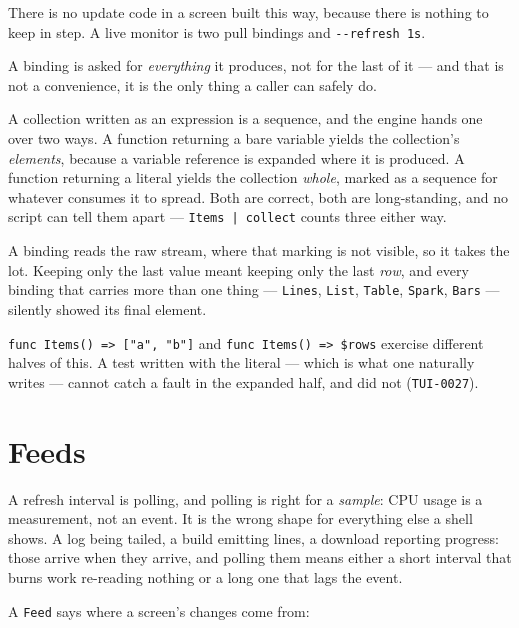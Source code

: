 \documentclass[11pt,a4paper,twoside,openany]{book}
\newcommand{\code}[1]{\texttt{\small #1}}
\begin{document}
\begin{tipbox}
There is no update code in a screen built this way, because there is nothing to
keep in step. A live monitor is two pull bindings and \code{-{}-refresh 1s}.
\end{tipbox}

A binding is asked for \emph{everything} it produces, not for the last of it --- and
that is not a convenience, it is the only thing a caller can safely do.

A collection written as an expression is a sequence, and the engine hands one over
two ways. A function returning a bare variable yields the collection's
\emph{elements}, because a variable reference is expanded where it is produced. A
function returning a literal yields the collection \emph{whole}, marked as a
sequence for whatever consumes it to spread. Both are correct, both are
long-standing, and no script can tell them apart --- \code{Items | collect} counts
three either way.

A binding reads the raw stream, where that marking is not visible, so it takes the
lot. Keeping only the last value meant keeping only the last \emph{row}, and every
binding that carries more than one thing --- \code{Lines}, \code{List},
\code{Table}, \code{Spark}, \code{Bars} --- silently showed its final element.

\begin{warnbox}
\code{func Items() => ["a", "b"]} and \code{func Items() => \$rows} exercise
different halves of this. A test written with the literal --- which is what one
naturally writes --- cannot catch a fault in the expanded half, and did not
(\code{TUI-0027}).
\end{warnbox}

\section{Feeds}
\label{sec:feeds}

A refresh interval is polling, and polling is right for a \emph{sample}: CPU usage
is a measurement, not an event. It is the wrong shape for everything else a shell
shows. A log being tailed, a build emitting lines, a download reporting progress:
those arrive when they arrive, and polling them means either a short interval that
burns work re-reading nothing or a long one that lags the event.

A \code{Feed} says where a screen's changes come from:
\end{document}
